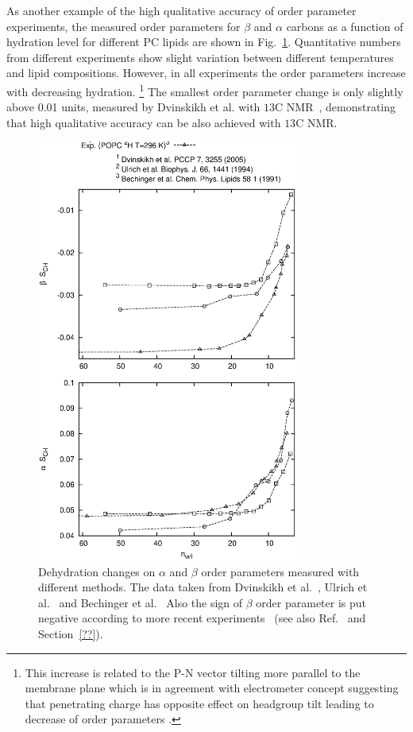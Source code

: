 \documentclass[aps,prl,superscriptaddress,twocolumn]{revtex4}
\begin{document}
As another example of the high qualitative accuracy of order parameter experiments, the measured order parameters
for $\beta$ and $\alpha$ carbons as a function of hydration level for different PC lipids are shown in 
Fig.~\ref{opDEHYDeffect}. Quantitative numbers from different experiments show slight variation between
different temperatures and lipid compositions. However, in all experiments the
order parameters increase with decreasing hydration.
\footnote{This increase is related to the P-N vector tilting more parallel to the membrane plane \cite{botan15}
which is in agreement with electrometer concept suggesting that penetrating charge has opposite 
effect on headgroup tilt leading to decrease of order parameters \cite{scherer89,ionpaper}.}
The smallest order parameter change is only slightly above 0.01 units, measured by Dvinskikh et al. 
with $ 13$C NMR~\cite{dvinskikh05b}, demonstrating that high qualitative accuracy can be
also achieved with $ 13$C NMR. 
\begin{figure}[]
  \includegraphics[width=8.6cm]{../Fig/OrderParameterDEHYDexp.eps}
\newline
  \caption{\label{opDEHYDeffect}
    Dehydration changes on $\alpha$ and $\beta$ order parameters measured with different methods. 
    The data taken from Dvinskikh et al.~\cite{dvinskikh05b}, Ulrich et al.~\cite{ulrich94} and Bechinger et al.~\cite{bechinger91}
    Also the sign of $\beta$ order parameter is put negative according
    to more recent experiments~\cite{??} (see also Ref.~\cite{botan15} and Section~\ref{??}).
  } 
\end{figure}
\end{document}
